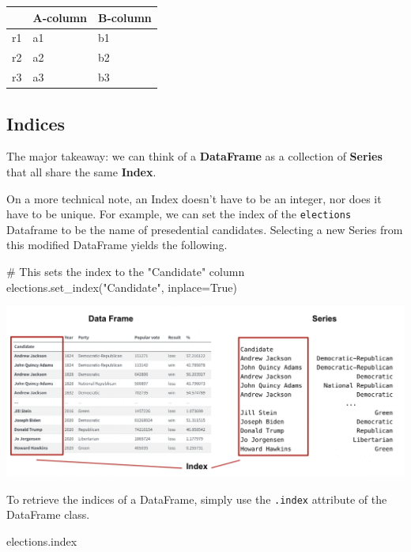 \documentclass[
  letterpaper,
  DIV=11,
  numbers=noendperiod]{scrreprt}
\newenvironment{Shaded}{\begin{snugshade}}{\end{snugshade}}
\newcommand{\CommentTok}[1]{\textcolor[rgb]{0.37,0.37,0.37}{#1}}
\newcommand{\NormalTok}[1]{\textcolor[rgb]{0.00,0.23,0.31}{#1}}
\newcommand{\OperatorTok}[1]{\textcolor[rgb]{0.37,0.37,0.37}{#1}}
\newcommand{\StringTok}[1]{\textcolor[rgb]{0.13,0.47,0.30}{#1}}
\newcommand{\VariableTok}[1]{\textcolor[rgb]{0.07,0.07,0.07}{#1}}
\begin{document}
\begin{tabular}{lll}
\toprule
{} & A-column & B-column \\
\midrule
r1 &       a1 &       b1 \\
r2 &       a2 &       b2 \\
r3 &       a3 &       b3 \\
\bottomrule
\end{tabular}

\hypertarget{indices}{%
\subsection{Indices}\label{indices}}

The major takeaway: we can think of a \textbf{DataFrame} as a collection
of \textbf{Series} that all share the same \textbf{Index}.

On a more technical note, an Index doesn't have to be an integer, nor
does it have to be unique. For example, we can set the index of the
\texttt{elections} Dataframe to be the name of presedential candidates.
Selecting a new Series from this modified DataFrame yields the
following.

\begin{Shaded}
\begin{Highlighting}[]
\CommentTok{\# This sets the index to the "Candidate" column}
\NormalTok{elections.set\_index(}\StringTok{"Candidate"}\NormalTok{, inplace}\OperatorTok{=}\VariableTok{True}\NormalTok{)}
\end{Highlighting}
\end{Shaded}

\includegraphics{pandas_1/images/index_comparison_2.png}

To retrieve the indices of a DataFrame, simply use the \texttt{.index}
attribute of the DataFrame class.

\begin{Shaded}
\begin{Highlighting}[]
\NormalTok{elections.index}
\end{Highlighting}
\end{Shaded}
\end{document}
